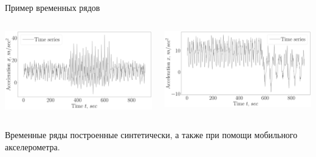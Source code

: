 \documentclass[10pt,pdf,hyperref={unicode}]{beamer}
\begin{document}
\begin{frame}[shrink=5]{Пример временных рядов}
\begin{columns}
    \begin{column}{0.5\textwidth}
        \includegraphics[width=1\textwidth]{results/real_1_series}
    \end{column}
    \begin{column}{0.5\textwidth}
        \includegraphics[width=1\textwidth]{results/real_2_series}
    \end{column}
\end{columns}

Временные ряды построенные синтетически, а также при помощи мобильного акселерометра.

\end{frame}
\end{document}

